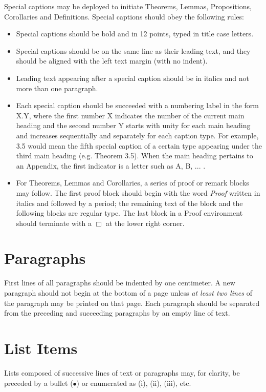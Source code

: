 \documentclass[a4paper,oneside,12pt]{report}
\numberwithin{equation}{chapter}
\begin{document}
Special captions may be deployed to initiate Theorems, Lemmas, Propositions, Corollaries and Definitions. Special captions should obey the following rules:
\begin{itemize}
\item Special captions should be bold and in 12 points, typed in title case letters.
\item Special captions should be on the same line as their leading text, and they should be aligned with the left text margin (with no indent).
\item Leading text appearing after a special caption should be in italics and not more than one paragraph.
\item Each special caption should be succeeded with a numbering label in the form X.Y, where the first number X indicates the number of the current main heading and the second number Y starts with unity for each main heading and increases sequentially and separately for each caption type. For example, 3.5 would mean the fifth special caption of a certain type appearing under the third main heading (e.g. Theorem 3.5). When the main heading pertains to an Appendix, the first indicator is a letter such as A, B, ... .
\item For Theorems, Lemmas and Corollaries, a series of proof or remark blocks may follow. The first proof block should begin with the word \textit{Proof} written in italics and followed by a period; the remaining text of the block and the following blocks are regular type. The last block in a Proof environment should terminate with a $\Box$ at the lower right corner.
\end{itemize}


\section{Paragraphs}

First lines of all paragraphs should be indented by one centimeter. A new paragraph should not begin at the bottom of a page unless \textit{at least two lines} of the paragraph may be printed on that page. Each paragraph should be separated from the preceding and succeeding paragraphs by an empty line of text.


\section{List Items}
Lists composed of successive lines of text or paragraphs may, for clarity, be preceded by a bullet ($\bullet$) or enumerated as (i), (ii), (iii), etc.
\end{document}
